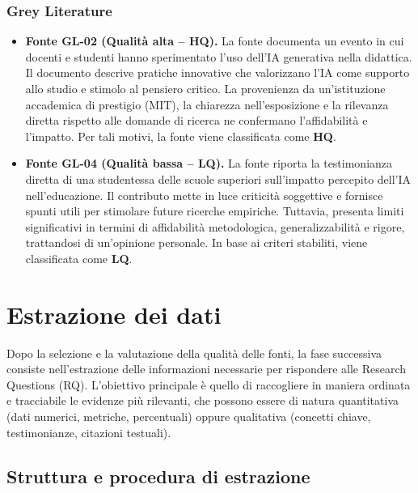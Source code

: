 \documentclass[a4paper,9pt]{article}
\begin{document}
\subsubsection{Grey Literature}
\begin{itemize}
	\item \textbf{Fonte GL-02 (Qualità alta – HQ).}  
La fonte documenta un evento in cui docenti e studenti hanno sperimentato l’uso dell’IA generativa nella didattica. Il documento descrive pratiche innovative che valorizzano l’IA come supporto allo studio e stimolo al pensiero critico. La provenienza da un’istituzione accademica di prestigio (MIT), la chiarezza nell’esposizione e la rilevanza diretta rispetto alle domande di ricerca ne confermano l’affidabilità e l’impatto. Per tali motivi, la fonte viene classificata come \textbf{HQ}.

	\item \textbf{Fonte GL-04 (Qualità bassa – LQ).}  
La fonte riporta la testimonianza diretta di una studentessa delle scuole superiori sull’impatto percepito dell’IA nell’educazione. Il contributo mette in luce criticità soggettive e fornisce spunti utili per stimolare future ricerche empiriche. Tuttavia, presenta limiti significativi in termini di affidabilità metodologica, generalizzabilità e rigore, trattandosi di un’opinione personale. In base ai criteri stabiliti, viene classificata come \textbf{LQ}.

\end{itemize}

	\section{Estrazione dei dati}
	
	Dopo la selezione e la valutazione della qualità delle fonti, la fase successiva consiste nell’estrazione delle informazioni necessarie per rispondere alle Research Questions (RQ).
	L’obiettivo principale è quello di raccogliere in maniera ordinata e tracciabile le evidenze più rilevanti, che possono essere di natura quantitativa (dati numerici, metriche, percentuali) oppure qualitativa (concetti chiave, testimonianze, citazioni testuali).
	
	\subsection{Struttura e procedura di estrazione}
	
\end{document}
